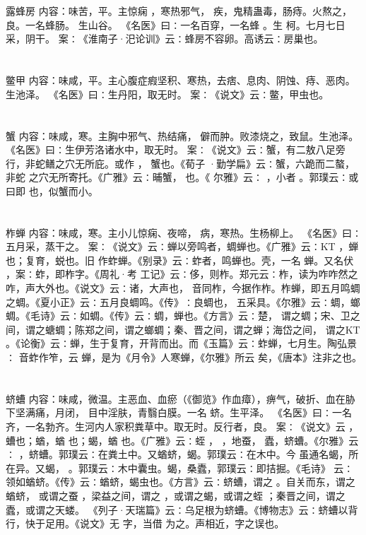 \documentclass[12pt,UTF8]{ctexbook}
\begin{document}
\section{}露蜂房
内容：味苦，平。主惊痫 ，寒热邪气， 疾，鬼精蛊毒，肠痔。火熬之，良。一名蜂肠。 
生山谷。 
《名医》曰∶一名百穿，一名蜂 。生 柯。七月七日采，阴干。 
案∶《淮南子·汜论训》云∶蜂房不容卵。高诱云∶房巢也。 


\section{}鳖甲
内容：味咸，平。主心腹症瘕坚积、寒热，去痞、息肉、阴蚀、痔、恶肉。生池泽。 
《名医》曰∶生丹阳，取无时。 
案∶《说文》云∶鳖，甲虫也。 


\section{}蟹
内容：味咸，寒。主胸中邪气、热结痛， 僻而肿。败漆烧之，致鼠。生池泽。 
《名医》曰∶生伊芳洛诸水中，取无时。 
案∶《说文》云∶蟹，有二敖八足旁行，非蛇鳝之穴无所庇。或作 ， 蟹也。《荀子 
·勤学扁》云∶蟹，六跪而二螯，非蛇 之穴无所寄托。《广雅》云∶晡蟹， 也。《 
尔雅》云∶ ，小者 。郭璞云∶或曰即 也，似蟹而小。 


\section{}柞蝉
内容：味咸，寒。主小儿惊痫、夜啼， 病，寒热。生杨柳上。 
《名医》曰∶五月采，蒸干之。 
案∶《说文》云∶蝉以旁鸣者，蜩蝉也。《广雅》云∶KT ，蝉也；复育，蜕也。旧 
作蚱蝉。《别录》云∶蚱者，鸣蝉也。壳，一名 蝉。又名伏 ，案∶蚱，即柞字。《周礼·考 
工记》云∶侈，则柞。郑元云∶柞，读为咋咋然之咋，声大外也。《说文》云∶诸，大声也， 
音同柞，今据作柞。柞蝉，即五月鸣蜩之蜩。《夏小正》云∶五月良蜩鸣。《传》∶良蜩也， 
五采具。《尔雅》云∶蜩，螂蜩。《毛诗》云∶如蜩。《传》云∶蜩，蝉也。《方言》云∶楚， 
谓之蜩；宋、卫之间，谓之螗蜩；陈郑之间，谓之螂蜩；秦、晋之间，谓之蝉；海岱之间， 
谓之KT 。《论衡》云∶蝉，生于复育，开背而出。而《玉篇》云∶蚱蝉，七月生。陶弘景∶ 
音蚱作笮，云 蝉，是为《月令》人寒蝉，《尔雅》所云 矣，《唐本》注非之也。 


\section{}蛴螬
内容：味咸，微温。主恶血、血瘀（《御览》作血瘴），痹气，破折、血在胁下坚满痛，月闭， 
目中淫肤，青翳白膜。一名 蛴。生平泽。 
《名医》曰∶一名 齐，一名勃齐。生河内人家积粪草中。取无时。反行者，良。 
案∶《说文》云 ， 螬也；蝤，蝤 也；蝎，蝤 也。《广雅》云∶蛭 ， ，地蚕， 
蠹，蛴螬。《尔雅》云∶ ，蛴螬。郭璞云∶在粪土中。又蝤蛴，蝎。郭璞云∶在木中。今 
虽通名蝎，所在异。又蝎， 。郭璞云∶木中囊虫。蝎，桑蠹，郭璞云∶即拮掘。《毛诗》 
云∶领如蝤蛴。《传》云∶蝤蛴，蝎虫也。《方言》云∶蛴螬，谓之 。自关而东，谓之蝤蛴， 
或谓之蚕 ，梁益之间，谓之 ，或谓之蝎，或谓之蛭 ；秦晋之间，谓之蠹，或谓之天蝼。 
《列子·天瑞篇》云∶乌足根为蛴螬。《博物志》云∶蛴螬以背行，快于足用。《说文》无 
字，当借 为之。声相近，字之误也。 
\end{document}
